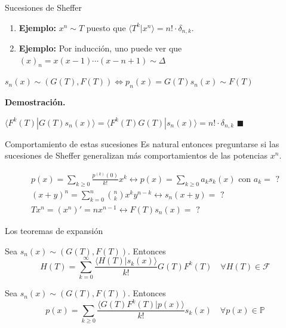 \documentclass{beamer}
\newenvironment{teorema}[1][]{
  \begin{tcolorbox}[colback=darkred!10, colframe=darkred!90, title=Teorema\ #1, fonttitle=\bfseries]
}{
  \end{tcolorbox}
}
\newenvironment{proposicion}[1][]{
  \begin{tcolorbox}[colback=darkred!10, colframe=darkred!70, title=Proposición\ #1, fonttitle=\bfseries]
}{
  \end{tcolorbox}
}
\newenvironment{demo}{%
  \par\medskip\noindent\textbf{Demostración.}\hspace{0.5em}%
}{%
  \hfill$\blacksquare$\par\medskip%
}
\newcommand{\F}{\mathscr{F}} %
\newcommand{\poly}{\mathbb{P}} %
\begin{document}
  \begin{frame}{Sucesiones de Sheffer}
      \begin{enumerate}
        \item \textbf{Ejemplo:} $x^n \sim T$ puesto que $\langle T^k| x^n\rangle = n! \cdot \delta_{n,k}$.
        \item \textbf{Ejemplo:} Por inducción, uno puede ver que $(x)_n = x(x-1)\cdots (x-n+1) \sim \Delta$
      \end{enumerate}

      \begin{proposicion}
        $s_n(x) \sim (G(T), F(T)) \iff p_n(x) = G(T)s_n(x) \sim F(T)$
      \end{proposicion}

      \begin{demo}
        $\langle F^k(T) | G(T)s_n(x) \rangle = \langle F^k(T)G(T) | s_n(x) \rangle = n! \cdot \delta_{n,k}$
      \end{demo}
  \end{frame}

  \begin{frame}{Comportamiento de estas sucesiones}
    Es natural entonces preguntarse si las sucesiones de Sheffer generalizan más comportamientos de las potencias $x^n$. 
      \begin{block}{}
        \begin{align*}
          p(x) = \sum_{k \geq 0} \frac{p^{(k)}(0)}{k!}x^k \leftrightarrow p(x) = \sum_{k \geq 0} a_k s_k(x) \text{ con } a_k = \text{ ?}\\
          (x+y)^n = \sum_{k=0}^{n} \binom{n}{k} x^k y^{n-k} \leftrightarrow s_n(x+y) = \text{ ?} \\
          Tx^n = (x^n)' = nx^{n-1} \leftrightarrow F(T)s_n(x) = \text{ ?}
        \end{align*}
      \end{block}
  \end{frame}

  \begin{frame}{Los teoremas de expansión}
    \begin{teorema}[(de expansión para series formales)]
      Sea $s_n(x) \sim (G(T), F(T))$. Entonces
      \begin{equation*}
        H(T) = \sum_{k = 0}^\infty \frac{\langle H(T)| s_k(x)\rangle}{k!}G(T)F^k(T) \quad \forall H(T) \in \F
      \end{equation*}
    \end{teorema}

    \begin{teorema}[(de expansión para polinomios)]
      Sea $s_n(x) \sim (G(T), F(T))$. Entonces
      \begin{equation*}
        p(x) = \sum_{k \geq 0} \frac{\langle G(T)F^k(T) | p(x) \rangle}{k!}s_k(x) \quad \forall p(x) \in \poly
      \end{equation*}
    \end{teorema}
  \end{frame}
\end{document}

